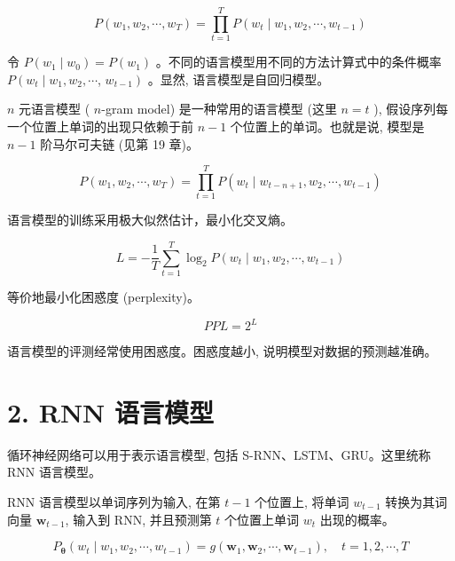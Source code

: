 \documentclass[10pt]{article}
\begin{document}
\begin{equation*}
P\left(w_{1}, w_{2}, \cdots, w_{T}\right)=\prod_{t=1}^{T} P\left(w_{t} \mid w_{1}, w_{2}, \cdots, w_{t-1}\right) \tag{25.46}
\end{equation*}


令 $P\left(w_{1} \mid w_{0}\right)=P\left(w_{1}\right)$ 。不同的语言模型用不同的方法计算式中的条件概率 $P\left(w_{t} \mid w_{1}, w_{2}, \cdots\right.$, $\left.w_{t-1}\right)$ 。显然, 语言模型是自回归模型。

$n$ 元语言模型 ( $n$-gram model) 是一种常用的语言模型 (这里 $n=t$ ), 假设序列每一个位置上单词的出现只依赖于前 $n-1$ 个位置上的单词。也就是说, 模型是 $n-1$ 阶马尔可夫链 (见第 19 章)。


\begin{equation*}
P\left(w_{1}, w_{2}, \cdots, w_{T}\right)=\prod_{t=1}^{T} P\left(w_{t} \mid w_{t-n+1}, w_{2}, \cdots, w_{t-1}\right) \tag{25.47}
\end{equation*}


语言模型的训练采用极大似然估计，最小化交叉熵。


\begin{equation*}
L=-\frac{1}{T} \sum_{t=1}^{T} \log _{2} P\left(w_{t} \mid w_{1}, w_{2}, \cdots, w_{t-1}\right) \tag{25.48}
\end{equation*}


等价地最小化困惑度 (perplexity)。


\begin{equation*}
P P L=2^{L} \tag{25.49}
\end{equation*}


语言模型的评测经常使用困惑度。困惑度越小, 说明模型对数据的预测越准确。

\section*{2. RNN 语言模型}
循环神经网络可以用于表示语言模型, 包括 S-RNN、LSTM、GRU。这里统称 RNN 语言模型。

$\mathrm{RNN}$ 语言模型以单词序列为输入, 在第 $t-1$ 个位置上, 将单词 $w_{t-1}$ 转换为其词向量 $\boldsymbol{w}_{t-1}$, 输入到 RNN, 并且预测第 $t$ 个位置上单词 $w_{t}$ 出现的概率。


\begin{equation*}
P_{\boldsymbol{\theta}}\left(w_{t} \mid w_{1}, w_{2}, \cdots, w_{t-1}\right)=g\left(\boldsymbol{w}_{1}, \boldsymbol{w}_{2}, \cdots, \boldsymbol{w}_{t-1}\right), \quad t=1,2, \cdots, T \tag{25.50}
\end{equation*}
\end{document}
